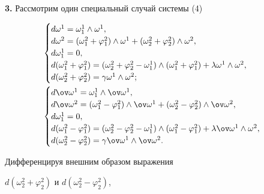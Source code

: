  


{\bf 3.} Рассмотрим один специальный случай системы (4) 


\begin{align} 


& 


\begin{cases} 


d\omega^1=\omega^1_1\wedge\omega^1, \\ 


d\omega^2=(\omega^2_1+\varphi^2_1)\wedge\omega^1+ 


(\omega^2_2+\varphi^2_2)\wedge\omega^2, \\ 


d\omega^1_1=0, \\ 


d(\omega^2_1+\varphi^2_1)=(\omega^2_2+\varphi^2_2-\omega^1_1) 


\wedge(\omega^2_1+\varphi^2_1)+\lambda\omega^1\wedge\omega^2, \\ 


d(\omega^2_2+\varphi^2_2)=\gamma\omega^1\wedge\omega^2; 


\end{cases} 


\\ 


& 


\begin{cases} 


d\ov\omega^1=\omega^1_1\wedge\ov\omega^1, \\ 


d\ov\omega^2=(\omega^2_1-\varphi^2_1)\wedge\ov\omega^1+ 


(\omega^2_2-\varphi^2_2)\wedge\ov\omega^2, \\ 


d\omega^1_1=0, \\ 


d(\omega^2_1-\varphi^2_1)=(\omega^2_2-\varphi^2_2-\omega^1_1)\wedge 


(\omega^2_1-\varphi^2_1)+\lambda\ov\omega^1\wedge\omega^2, \\ 


d(\omega^2_2-\varphi^2_2)=\gamma\ov\omega^1\wedge\ov\omega^2. 


\end{cases} 


\end{align} 


Дифференцируя внешним образом выражения 


$d(\omega^2_2+\varphi^2_2)$ и $d(\omega^2_2-\varphi^2_2)$,


